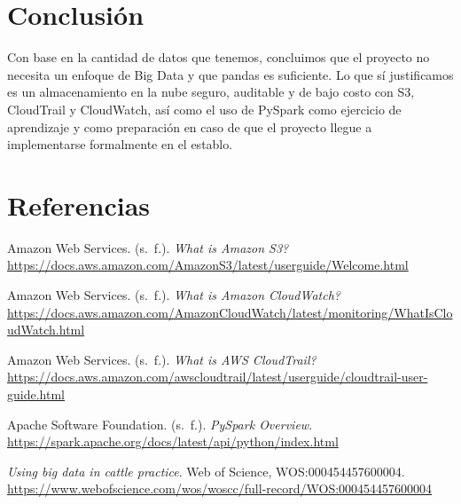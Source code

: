 \documentclass[11pt,letterpaper,DIV=12]{scrartcl}
\begin{document}
\section{Conclusión}

Con base en la cantidad de datos que tenemos, concluimos que el proyecto no necesita un enfoque de Big Data y que pandas es suficiente. Lo que sí justificamos es un almacenamiento en la nube seguro, auditable y de bajo costo con S3, CloudTrail y CloudWatch, así como el uso de PySpark como ejercicio de aprendizaje y como preparación en caso de que el proyecto llegue a implementarse formalmente en el establo.

\section*{Referencias}

\begin{list}{}{\setlength{\leftmargin}{2em}\setlength{\itemindent}{-2em}\setlength{\itemsep}{0.5ex}}
\item Amazon Web Services. (s.~f.). \emph{What is Amazon S3?} \url{https://docs.aws.amazon.com/AmazonS3/latest/userguide/Welcome.html}
\item Amazon Web Services. (s.~f.). \emph{What is Amazon CloudWatch?} \url{https://docs.aws.amazon.com/AmazonCloudWatch/latest/monitoring/WhatIsCloudWatch.html}
\item Amazon Web Services. (s.~f.). \emph{What is AWS CloudTrail?} \url{https://docs.aws.amazon.com/awscloudtrail/latest/userguide/cloudtrail-user-guide.html}
\item Apache Software Foundation. (s.~f.). \emph{PySpark Overview}. \url{https://spark.apache.org/docs/latest/api/python/index.html}
\item \emph{Using big data in cattle practice}. Web of Science, WOS:000454457600004. \url{https://www.webofscience.com/wos/woscc/full-record/WOS:000454457600004}
\end{list}
\end{document}
